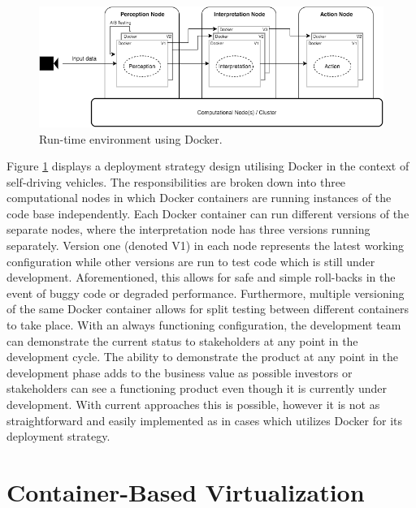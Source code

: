 \begin{figure}[ht]
\centering
     \includegraphics[width=1.0\textwidth]{./figure/containers.png}
      \caption{Run-time environment using Docker.}
       \label{containers}
\end{figure}

Figure \ref{containers} displays a deployment strategy design utilising Docker in the context of self-driving vehicles. The responsibilities are broken down into three computational nodes in which Docker containers are running instances of the code base independently. Each Docker container can run different versions of the separate nodes, where the interpretation node has three versions running separately. Version one (denoted V1) in each node represents the latest working configuration while other versions are run to test code which is still under development. Aforementioned, this allows for safe and simple roll-backs in the event of buggy code or degraded performance. Furthermore, multiple versioning of the same Docker container allows for split testing between different containers to take place. With an always functioning configuration, the development team can demonstrate the current status to stakeholders at any point in the development cycle. The ability to demonstrate the product at any point in the development phase adds to the business value as possible investors or stakeholders can see a functioning product even though it is currently under development. With current approaches this is possible, however it is not as straightforward and easily implemented as in cases which utilizes Docker for its deployment strategy.
\section{Container-Based Virtualization}

